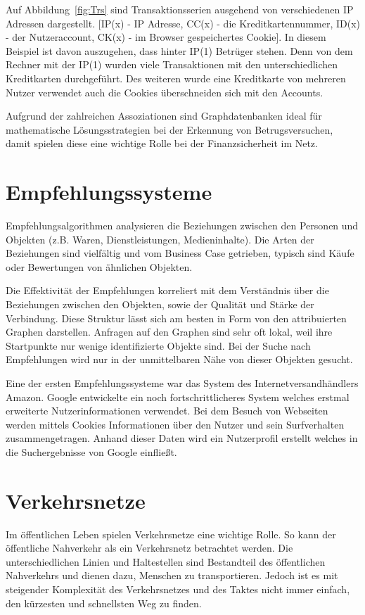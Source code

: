 Auf Abbildung~\ref{fig:Trs} sind Transaktionsserien ausgehend von verschiedenen IP Adressen dargestellt. [IP(x) - IP Adresse, CC(x) - die Kreditkartennummer, ID(x) - der Nutzeraccount, CK(x) - im Browser gespeichertes Cookie]. In diesem Beispiel ist davon auszugehen, dass hinter IP(1) Betrüger stehen. Denn von dem Rechner mit der IP(1) wurden viele Transaktionen mit den unterschiedlichen Kreditkarten durchgeführt. Des weiteren wurde eine Kreditkarte von mehreren Nutzer verwendet auch die Cookies überschneiden sich mit den Accounts.\cite{Betrugserkennung}

Aufgrund der zahlreichen Assoziationen sind Graphdatenbanken ideal für mathematische Lösungsstrategien bei der Erkennung von Betrugsversuchen, damit spielen diese eine wichtige Rolle bei der Finanzsicherheit im Netz.

\section{Empfehlungssysteme}
Empfehlungsalgorithmen analysieren die Beziehungen zwischen den Personen und Objekten (z.B. Waren, Dienstleistungen, Medieninhalte). Die Arten der Beziehungen sind vielfältig und vom Business Case getrieben, typisch sind Käufe oder Bewertungen von ähnlichen Objekten.

Die Effektivität der Empfehlungen korreliert mit dem Verständnis über die Beziehungen zwischen den Objekten, sowie der Qualität und Stärke der Verbindung. Diese Struktur lässt sich am besten in Form von den attribuierten Graphen darstellen. Anfragen auf den Graphen sind sehr oft lokal, weil ihre Startpunkte nur wenige identifizierte Objekte sind. Bei der Suche nach Empfehlungen wird nur in der unmittelbaren Nähe von dieser Objekten gesucht.

Eine der ersten Empfehlungssysteme war das System des Internetversandhändlers Amazon. Google entwickelte ein noch fortschrittlicheres System welches erstmal erweiterte Nutzerinformationen verwendet. Bei dem Besuch von Webseiten werden mittels Cookies Informationen über den Nutzer und sein Surfverhalten zusammengetragen. Anhand dieser Daten wird ein Nutzerprofil erstellt welches in die Suchergebnisse von Google einfließt.
\cite[p.~107]{GraphDB}

\section{Verkehrsnetze}
Im öffentlichen Leben spielen Verkehrsnetze eine wichtige Rolle. So kann der öffentliche Nahverkehr als ein Verkehrsnetz betrachtet werden. Die unterschiedlichen Linien und Haltestellen sind Bestandteil des öffentlichen Nahverkehrs und dienen dazu, Menschen zu transportieren. Jedoch ist es mit steigender Komplexität des Verkehrsnetzes und des Taktes nicht immer einfach, den kürzesten und schnellsten Weg zu finden.


